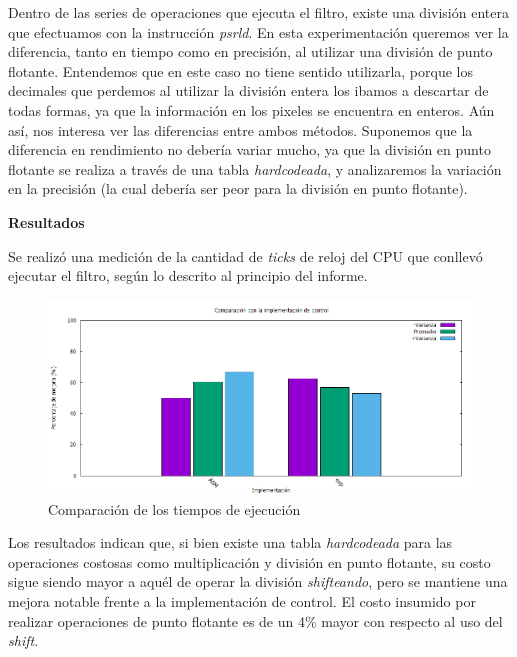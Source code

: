 \documentclass[a4paper]{article}
\begin{document}
Dentro de las series de operaciones que ejecuta el filtro, existe una división entera que efectuamos con la instrucción \textit{psrld}. En esta experimentación queremos ver la diferencia, tanto en tiempo como en precisión, al utilizar una división de punto flotante. Entendemos que en este caso no tiene sentido utilizarla, porque los decimales que perdemos al utilizar la división entera los ibamos a descartar de todas formas, ya que la información en los pixeles se encuentra en enteros. Aún así, nos interesa ver las diferencias entre ambos métodos. Suponemos que la diferencia en rendimiento no debería variar mucho, ya que la división en punto flotante se realiza a través de una tabla \textit{hardcodeada}, y analizaremos la variación en la precisión (la cual debería ser peor para la división en punto flotante).
\newline

\textbf{Resultados}

Se realizó una medición de la cantidad de \textit{ticks} de reloj del CPU que conllevó ejecutar el filtro, según lo descrito al principio del informe.
\\
\begin{figure}[H]
  \begin{center}
	\includegraphics[scale=0.66]{imagenes/pixelarExp.png}
	\caption{Comparación de los tiempos de ejecución}
	\label{pixelar_exp}
  \end{center}
\end{figure}

Los resultados indican que, si bien existe una tabla \textit{hardcodeada} para las operaciones costosas como multiplicación y división en punto flotante, su costo sigue siendo mayor a aquél de operar la división \textit{shifteando}, pero se mantiene una mejora notable frente a la implementación de control. El costo insumido por realizar operaciones de punto flotante es de un 4\% mayor con respecto al uso del \textit{shift}.
\end{document}
